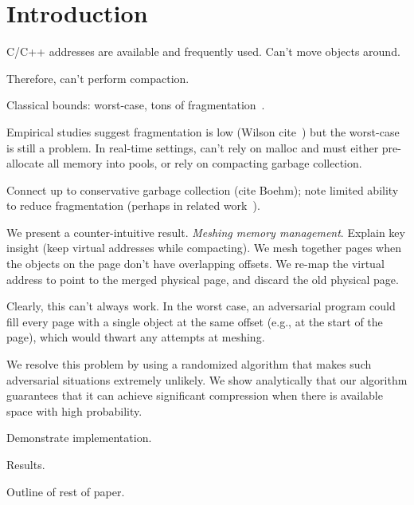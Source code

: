 \section{Introduction}
\label{sec:introduction}

C/C++ addresses are available and frequently used. Can't move objects around.

Therefore, can't perform compaction.

Classical bounds: worst-case, tons of fragmentation~\cite{robson1977worst}.

Empirical studies suggest fragmentation is low (Wilson cite~\cite{Johnstone:1998:MFP:286860.286864}) but the
worst-case is still a problem. In real-time settings, can't rely on
malloc and must either pre-allocate all memory into pools, or rely on
compacting garbage collection.

Connect up to conservative garbage collection (cite Boehm); note
limited ability to reduce fragmentation (perhaps in related
work~\cite{Rodriguez-Rivera:1998:NNG:286860.286869}).

We present a counter-intuitive result. \emph{Meshing memory
  management}. Explain key insight (keep virtual addresses while
compacting). We mesh together pages when the objects on the page don't
have overlapping offsets. We re-map the virtual address to point to
the merged physical page, and discard the old physical page.

Clearly, this can't always work. In the worst case, an adversarial
program could fill every page with a single object at the same offset
(e.g., at the start of the page), which would thwart any attempts at
meshing.

We resolve this problem by using a randomized algorithm that makes
such adversarial situations extremely unlikely. We show analytically
that our algorithm guarantees that it can achieve significant
compression when there is available space with high probability.

Demonstrate implementation.

Results.

Outline of rest of paper.
